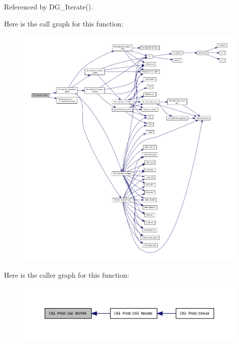 Referenced by D\+G\+\_\+\+Iterate().

Here is the call graph for this function\+:
\nopagebreak
\begin{figure}[H]
\begin{center}
\leavevmode
\includegraphics[width=350pt]{classDG__Prob_af4fefe289d5d1beb69636817eb9f9703_cgraph}
\end{center}
\end{figure}
Here is the caller graph for this function\+:
\nopagebreak
\begin{figure}[H]
\begin{center}
\leavevmode
\includegraphics[width=350pt]{classDG__Prob_af4fefe289d5d1beb69636817eb9f9703_icgraph}
\end{center}
\end{figure}
\mbox{\label{classDG__Prob_a4874e2992ccde1658a6ab46bc595779f}} 
